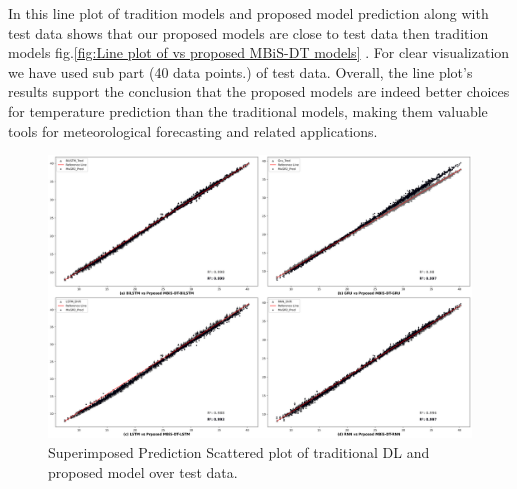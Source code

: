 \documentclass[sn-mathphys,Numbered]{sn-jnl}
\theoremstyle{thmstyleone}
\theoremstyle{thmstyletwo}
\theoremstyle{thmstylethree}
\begin{document}
In this line plot of tradition models and proposed model prediction along with test data shows that our proposed models are close to test data then tradition models fig.\ref{fig:Line plot of vs proposed MBiS-DT models} .  For clear visualization we have used sub part (40 data points.) of test data.   Overall, the line plot's results support the conclusion that the proposed models are indeed better choices for temperature prediction than the traditional models, making them valuable tools for meteorological forecasting and related applications.

\begin{figure}
    \centering
    \includegraphics[scale=0.25]{scatter_Plot.png}
    \caption{Superimposed Prediction Scattered plot of traditional DL and proposed model over test data.}
    \label{fig:Scatter plot of vs proposed MBiS-DT models}
\end{figure}
\end{document}
